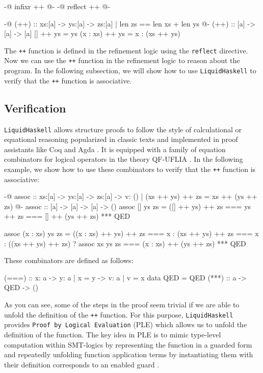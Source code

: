 \documentclass[]{rptuseminar}
\begin{document}
\begin{haskell}
{-@ infixr ++ @-}
{-@ reflect ++ @-}

{-@ (++) :: xs:[a] -> ys:[a] -> { zs:[a] | len zs == len xs + len ys } @-}
(++) :: [a] -> [a] -> [a]
[] ++ ys = ys
(x : xs) ++ ys = x : (xs ++ ys)
\end{haskell}

The \texttt{++} function is defined in the refinement logic using the \texttt{reflect} directive.
Now we can use the \texttt{++} function in the refinement logic to reason about the program.
In the following subsection, we will show how to use \texttt{LiquidHaskell} to verify that  the \texttt{++} function is associative.

\subsection{Verification}
\texttt{LiquidHaskell} allows structure proofs to follow the style of calculational or equational reasoning popularized in classic texts
and implemented in proof assistants like Coq and Agda . It is equipped with a family of equation combinators
for logical operators in the theory QF-UFLIA \cite{vazou_refinement_2018}.
In the following example, we show how to use these combinators to verify that the \texttt{++} function is associative:

\begin{haskell}
{-@ assoc :: xs:[a] -> ys:[a] -> zs:[a] 
  -> { v: () | (xs ++ ys) ++ zs = xs ++ (ys ++ zs) } @-}
assoc :: [a] -> [a] -> [a] -> ()
assoc [] ys zs =
  ([] ++ ys)
    ++ zs
    === ys
    ++ zs
    === []
    ++ (ys ++ zs)
    *** QED

assoc (x : xs) ys zs =
  ((x : xs) ++ ys) ++ zs
    ===  x : (xs ++ ys) ++ zs
    === x
    : ((xs ++ ys) ++ zs)
      ? assoc xs ys zs
      === (x : xs)
      ++ (ys ++ zs)
      *** QED
\end{haskell}

These combinators are defined as follows:
\begin{haskell}
  (===) :: x: a -> y: { a | x = y }  -> { v: a | v = x }
  data QED = QED
  (***) :: a -> QED -> ()
\end{haskell}

As you can see, some of the steps in the proof seem trivial if we are able to unfold the definition of the \texttt{++} function.
For this purpose, \texttt{LiquidHaskell} provides \texttt{Proof by Logical Evaluation} (PLE) which allows us to unfold the definition of the function.
The key idea in PLE is to mimic type-level computation within SMT-logics by representing the function in a guarded form and repeatedly unfolding function
application terms by instantiating them with their definition corresponds to an enabled guard \cite{vazou_refinement_2018}.
\end{document}
